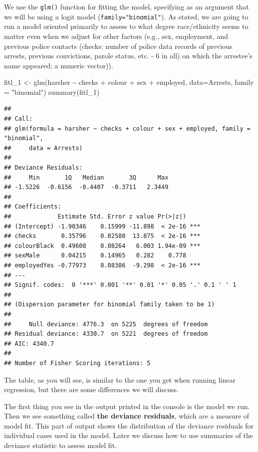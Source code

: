 \documentclass[
]{book}
\newenvironment{Shaded}{\begin{snugshade}}{\end{snugshade}}
\newcommand{\AttributeTok}[1]{\textcolor[rgb]{0.77,0.63,0.00}{#1}}
\newcommand{\FunctionTok}[1]{\textcolor[rgb]{0.00,0.00,0.00}{#1}}
\newcommand{\NormalTok}[1]{#1}
\newcommand{\OtherTok}[1]{\textcolor[rgb]{0.56,0.35,0.01}{#1}}
\newcommand{\SpecialCharTok}[1]{\textcolor[rgb]{0.00,0.00,0.00}{#1}}
\newcommand{\StringTok}[1]{\textcolor[rgb]{0.31,0.60,0.02}{#1}}
\begin{document}
We use the \texttt{glm()} function for fitting the model, specifying as an argument that we will be using a logit model (\texttt{family="binomial"}). As stated, we are going to run a model oriented primarily to assess to what degree race/ethnicity seems to matter even when we adjust for other factors (e.g., sex, employment, and previous police contacts (checks: number of police data records of previous arrests, previous convictions, parole status, etc. - 6 in all) on which the arrestee's name appeared; a numeric vector)).

\begin{Shaded}
\begin{Highlighting}[]
\NormalTok{fitl\_1 }\OtherTok{\textless{}{-}} \FunctionTok{glm}\NormalTok{(harsher }\SpecialCharTok{\textasciitilde{}}\NormalTok{ checks }\SpecialCharTok{+}\NormalTok{ colour }\SpecialCharTok{+}\NormalTok{ sex }\SpecialCharTok{+}\NormalTok{ employed, }\AttributeTok{data=}\NormalTok{Arrests, }\AttributeTok{family =} \StringTok{"binomial"}\NormalTok{)}
\FunctionTok{summary}\NormalTok{(fitl\_1)}
\end{Highlighting}
\end{Shaded}

\begin{verbatim}
## 
## Call:
## glm(formula = harsher ~ checks + colour + sex + employed, family = "binomial", 
##     data = Arrests)
## 
## Deviance Residuals: 
##     Min       1Q   Median       3Q      Max  
## -1.5226  -0.6156  -0.4407  -0.3711   2.3449  
## 
## Coefficients:
##             Estimate Std. Error z value Pr(>|z|)    
## (Intercept) -1.90346    0.15999 -11.898  < 2e-16 ***
## checks       0.35796    0.02580  13.875  < 2e-16 ***
## colourBlack  0.49608    0.08264   6.003 1.94e-09 ***
## sexMale      0.04215    0.14965   0.282    0.778    
## employedYes -0.77973    0.08386  -9.298  < 2e-16 ***
## ---
## Signif. codes:  0 '***' 0.001 '**' 0.01 '*' 0.05 '.' 0.1 ' ' 1
## 
## (Dispersion parameter for binomial family taken to be 1)
## 
##     Null deviance: 4776.3  on 5225  degrees of freedom
## Residual deviance: 4330.7  on 5221  degrees of freedom
## AIC: 4340.7
## 
## Number of Fisher Scoring iterations: 5
\end{verbatim}

The table, as you will see, is similar to the one you get when running linear regression, but there are some differences we will discuss.

The first thing you see in the output printed in the console is the model we run. Then we see something called \textbf{the deviance residuals}, which are a measure of model fit. This part of output shows the distribution of the deviance residuals for individual cases used in the model. Later we discuss how to use summaries of the deviance statistic to assess model fit.
\end{document}

